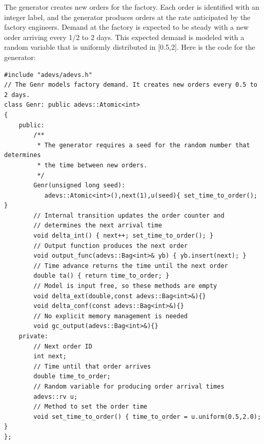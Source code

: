 The generator creates new orders for the factory. Each order is identified with an integer label, and the generator produces orders at the rate anticipated by the factory engineers. Demand at the factory is expected to be steady with a new order arriving every 1/2 to 2 days. This expected demand is modeled with a random variable that is uniformly distributed in [0.5,2]. Here is the code for the generator:
\begin{verbatim}
#include "adevs/adevs.h"
// The Genr models factory demand. It creates new orders every 0.5 to 2 days.
class Genr: public adevs::Atomic<int>
{
    public:
        /**
         * The generator requires a seed for the random number that determines
         * the time between new orders.
         */
        Genr(unsigned long seed):
           adevs::Atomic<int>(),next(1),u(seed){ set_time_to_order(); }
        // Internal transition updates the order counter and
		// determines the next arrival time
        void delta_int() { next++; set_time_to_order(); }
        // Output function produces the next order
        void output_func(adevs::Bag<int>& yb) { yb.insert(next); }
        // Time advance returns the time until the next order
        double ta() { return time_to_order; }
        // Model is input free, so these methods are empty
        void delta_ext(double,const adevs::Bag<int>&){}
        void delta_conf(const adevs::Bag<int>&){}
        // No explicit memory management is needed
        void gc_output(adevs::Bag<int>&){}
    private:
        // Next order ID
        int next;
        // Time until that order arrives
        double time_to_order;
        // Random variable for producing order arrival times
        adevs::rv u;
        // Method to set the order time
        void set_time_to_order() { time_to_order = u.uniform(0.5,2.0); }
};
\end{verbatim}

